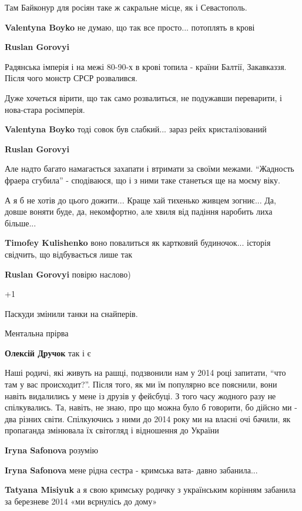 \begin{itemize}
\begin{itemize}
Там Байконур для росіян таке ж сакральне місце, як і Севастополь.

\textbf{Valentyna Boyko} не думаю, що так все просто... потоплять в крові

\textbf{Ruslan Gorovyi} 

Радянська імперія і на межі 80-90-х в крові топила - країни Балтії, Закавказзя.
Після чого монстр СРСР розвалився.

Дуже хочеться вірити, що так само розвалиться, не подужавши переварити, і
нова-стара росімперія.

\textbf{Valentyna Boyko} тоді совок був слабкий... зараз рейх кристалізований

\textbf{Ruslan Gorovyi} 

Але надто багато намагається захапати і втримати за своїми межами. \enquote{Жадность
фраера сгубила} - сподіваюся, що і з ними таке станеться ще на моєму віку.

\end{itemize} %


А я б не хотів до цього дожити... Краще хай тихенько живцем зогниє... Да, довше
воняти буде, да, некомфортно, але хвиля від падіння наробить лиха більше...

\begin{itemize} %
\textbf{Timofey Kulishenko} воно повалиться як картковий будиночок... історія свідчить, що відбувається лише так

\textbf{Ruslan Gorovyi} повірю наслово)
\end{itemize} %

+1

Паскуди змінили танки на снайперів.

Ментальна прірва

\textbf{Олексій Дручок} так і є


Наші родичі, які живуть на рашці, подзвонили нам у 2014 році запитати, \enquote{что там
у вас происходит?}. Після того, як ми їм популярно все пояснили, вони навіть
видалились у мене із друзів у фейсбуці. З того часу жодного разу не
спілкувались. Та, навіть, не знаю, про що можна було б говорити, бо дійсно ми -
два різних світи. Спілкуючись з ними до 2014 року ми на власні очі бачили, як
пропаганда змінювала їх світогляд і відношення до України

\begin{itemize} %
\textbf{Iryna Safonova} розумію

\textbf{Iryna Safonova} мене рідна сестра - кримська вата- давно забанила...

\textbf{Tatyana Misiyuk} а я свою кримську родичку з українським корінням забанила за березневе 2014 «ми вєрнулісь до дому»
\end{itemize} %



\end{itemize} %
